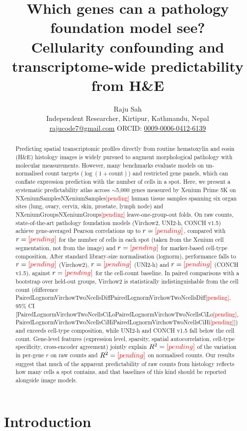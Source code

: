 \documentclass[10pt,twocolumn]{article}
\title{Which genes can a pathology foundation model see?\\
\large Cellularity confounding and transcriptome-wide predictability from H\&E}
\author{Raju Sah\\
\small Independent Researcher, Kirtipur, Kathmandu, Nepal\\
\small \href{mailto:rajucode7@gmail.com}{rajucode7@gmail.com} \quad ORCID: \href{https://orcid.org/0009-0006-0412-6139}{0009-0006-0412-6139}}
\date{}
\providecommand{\pending}{\textcolor{red}{[pending]}}
\newcommand{\num}[1]{\ifcsname #1\endcsname\csname #1\endcsname\else\pending\fi}
\begin{document}
\maketitle

\begin{abstract}
Predicting spatial transcriptomic profiles directly from routine hematoxylin and eosin (H\&E) histology images is widely pursued to augment morphological pathology with molecular measurements. However, many benchmarks evaluate models on un-normalised count targets ($\log(1+\text{count})$) and restricted gene panels, which can conflate expression prediction with the number of cells in a spot. Here, we present a systematic predictability atlas across $\sim$5{,}000 genes measured by Xenium Prime 5K on \num{NXeniumSamples} human tissue samples spanning six organ sites (lung, ovary, cervix, skin, prostate, lymph node) and \num{NXeniumGroups} leave-one-group-out folds. On raw counts, state-of-the-art pathology foundation models (Virchow2, UNI2-h, CONCH v1.5) achieve gene-averaged Pearson correlations up to $r=\num{AtlasVirchowTwo}$, compared with $r=\num{AtlasNcells}$ for the number of cells in each spot (taken from the Xenium cell segmentation, not from the image) and $r=\num{AtlasComposition}$ for marker-based cell-type composition. After standard library-size normalisation ($\text{lognorm}$), performance falls to $r=\num{AtlasnormVirchowTwo}$ (Virchow2), $r=\num{AtlasnormUniTwoH}$ (UNI2-h) and $r=\num{AtlasnormConchVOneFive}$ (CONCH v1.5), against $r=\num{AtlasnormNcells}$ for the cell-count baseline. In paired comparisons with a bootstrap over held-out groups, Virchow2 is statistically indistinguishable from the cell count (difference \num{PairedLognormVirchowTwoNcellsDiff}, 95\% CI [\num{PairedLognormVirchowTwoNcellsCiLo}, \num{PairedLognormVirchowTwoNcellsCiHi}]) and exceeds cell-type composition, while UNI2-h and CONCH v1.5 fall below the cell count. Gene-level features (expression level, sparsity, spatial autocorrelation, cell-type specificity, cross-encoder agreement) jointly explain $R^2=\num{ExplainRsqLogOnePlus}$ of the variation in per-gene $r$ on raw counts and $R^2=\num{ExplainRsqLognorm}$ on normalised counts. Our results suggest that much of the apparent predictability of raw counts from histology reflects how many cells a spot contains, and that baselines of this kind should be reported alongside image models.
\end{abstract}

\section{Introduction}
\label{sec:intro}
\end{document}
